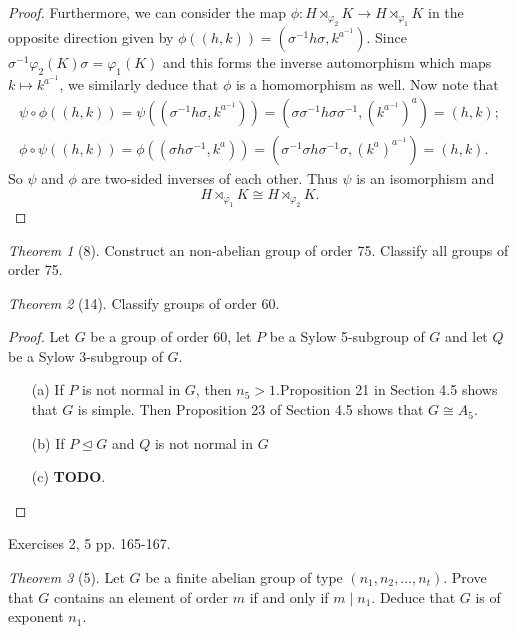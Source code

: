 \documentclass[12pt]{article}
\theoremstyle{remark}
\theoremstyle{named}
\newtheorem*{theorem}{Theorem}
\newcommand{\normal}{\trianglelefteq}
\begin{document}
\begin{proof}
    Furthermore, we can consider the map \(\phi : H \rtimes_{\varphi_2} K \to H \rtimes_{\varphi_1} K\) in the opposite direction given by \(\phi((h, k)) = (\sigma^{-1}h\sigma, k^{a^{-1}})\). Since \(\sigma^{-1}\varphi_2(K)\sigma = \varphi_1(K)\) and this forms the inverse automorphism which maps \(k \mapsto k^{a^{-1}}\), we similarly deduce that \(\phi\) is a homomorphism as well. Now note that 
    \begin{align*}
        \psi \circ \phi ((h, k)) = \psi((\sigma^{-1}h\sigma, k^{a^{-1}})) = (\sigma\sigma^{-1}h\sigma\sigma^{-1}, (k^{a^{-1}})^a) = (h, k); \\
        \phi \circ \psi ((h, k)) = \phi((\sigma h\sigma^{-1}, k^{a})) = (\sigma^{-1}\sigma h\sigma^{-1}\sigma, (k^{a})^{a^{-1}}) = (h, k).
    \end{align*}
    So \(\psi\) and \(\phi\) are two-sided inverses of each other. Thus \(\psi\) is an isomorphism and 
    \[H \rtimes_{\varphi_1} K \cong H \rtimes_{\varphi_2} K.\]
\end{proof}

\begin{theorem}[8]
    Construct an non-abelian group of order 75. Classify all groups of order 75. 
\end{theorem}

\begin{theorem}[14]
    Classify groups of order 60.
\end{theorem}

\begin{proof}
    Let \(G\) be a group of order 60, let \(P\) be a Sylow 5-subgroup of \(G\) and let \(Q\) be a Sylow 3-subgroup of \(G\).
    \begin{enumerate}
        \item[(a)] If \(P\) is not normal in \(G\), then \(n_5 > 1\).Proposition 21 in Section 4.5 shows that \(G\) is simple. Then Proposition 23 of Section 4.5 shows that \(G \cong A_5\). 
         
        \item[(b)] If \(P \normal G\) and \(Q\) is not normal in \(G\)
         
        \item[(c)] \textbf{TODO}.
    \end{enumerate}
\end{proof}

Exercises 2, 5 pp. 165-167.

\begin{theorem}[5]
    Let \(G\) be a finite abelian group of type \((n_1, n_2, \dots, n_t)\). Prove that \(G\) contains an element of order \(m\) if and only if \(m \mid n_1\). Deduce that \(G\) is of exponent \(n_1\).
\end{theorem}
\end{document}
